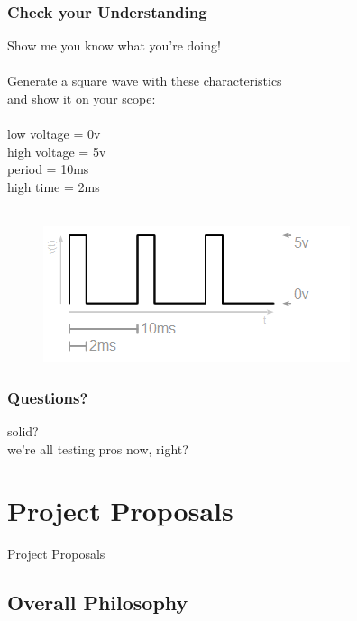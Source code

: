 \documentclass{beamer}
\begin{document}
\begin{frame}
\frametitle{Check your Understanding}
\centering
Show me you know what you're doing! \\
\hfill \\
Generate a square wave with these characteristics \\
and show it on your scope: \\
\hfill \\
low voltage = 0v \\
high voltage = 5v \\
period = 10ms \\
high time = 2ms \\
\hfill \\
\begin{figure}
  \centering
  \includegraphics[width=0.4\columnwidth]{images-dis2/funcwave-square-task}
\end{figure}
\end{frame}

\begin{frame}
\frametitle{Questions?}
\centering
{\huge solid?} \\
\vspace{20px}
\tiny{we're all testing pros now, right?}
\end{frame}

\section{Project Proposals} %
\begin{frame}
\centering \huge Project Proposals
\end{frame}

\subsection{Overall Philosophy}
\end{document}
